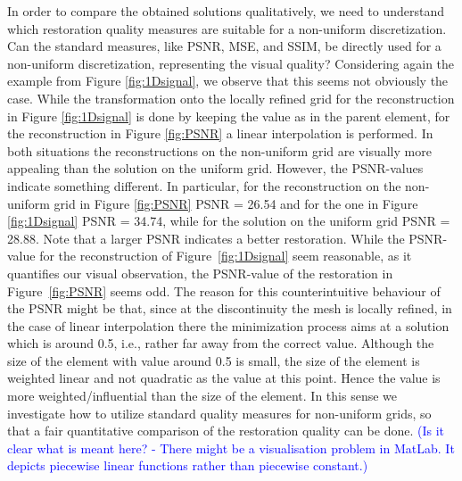 \documentclass[enabledeprecatedfontcommands,cleardoublepage=empty,headsepline,twoside,11pt,DIV=15,BCOR=12mm,final]{scrartcl}
\begin{document}
 In order to compare the obtained solutions qualitatively, we need to understand which restoration quality measures are suitable for a non-uniform discretization. Can the standard measures, like PSNR, MSE, and SSIM, be directly used for a non-uniform discretization, representing the visual quality? Considering again the example from Figure \ref{fig:1Dsignal}, we observe that this seems not obviously the case. While the transformation onto the locally refined grid for the reconstruction in Figure \ref{fig:1Dsignal} is done by keeping the value as in the parent element, for the reconstruction in Figure \ref{fig:PSNR} a linear interpolation is performed. In both situations the reconstructions on the non-uniform grid are visually more appealing than the solution on the uniform grid. However, the PSNR-values indicate something different. In particular, for the reconstruction on the non-uniform grid in Figure \ref{fig:PSNR} PSNR = 26.54 and for the one in Figure \ref{fig:1Dsignal} PSNR = 34.74, while for the solution on the uniform grid PSNR = 28.88. Note that a larger PSNR indicates a better restoration. While the PSNR-value for the reconstruction of Figure~\ref{fig:1Dsignal} seem reasonable, as it quantifies our visual observation, the PSNR-value of the restoration in Figure~\ref{fig:PSNR} seems odd. The reason for this counterintuitive behaviour of the PSNR might be that, since at the discontinuity the mesh is locally refined, in the case of linear interpolation there the minimization process aims at a solution which is around 0.5, i.e., rather far away from the correct value. Although the size of the element with value around 0.5 is small, the size of the element is weighted linear and not quadratic as the value at this point. Hence the value is more weighted/influential than the size of the element. In this sense we investigate how to utilize standard quality measures for non-uniform grids, so that a fair quantitative comparison of the restoration quality can be done. \textcolor{blue}{(Is it clear what is meant here? - There might be a visualisation problem in MatLab. It depicts piecewise linear functions rather than piecewise constant.)}
 
 
\end{document}
